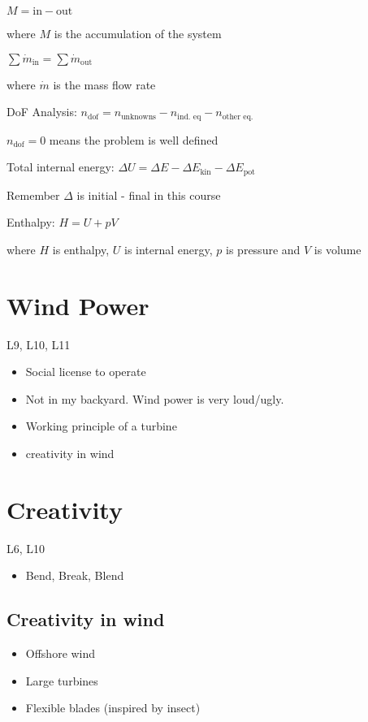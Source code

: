 \documentclass[a4paper, 12pt]{article}
\begin{document}
$M = \text{in} - \text{out}$

{\scriptsize where $M$ is the accumulation of the system\/}

$\sum \dot{m}_{\text{in}} = \sum \dot{m}_{\text{out}}$

{\scriptsize where $\dot{m}$ is the mass flow rate\/}

DoF Analysis:
$n_{\text{dof}} = n_{\text{unknowns}} - n_{\text{ind. eq}} - n_{\text{other eq.}}$

{\scriptsize $n_{\text{dof}}=0$ means the problem is well defined \/}

Total internal energy:
$\Delta U = \Delta E - \Delta E_{\text{kin}} - \Delta E_{\text{pot}}$

{\scriptsize Remember $\Delta$ is initial - final in this course\/}

Enthalpy:
$H = U + pV$

{\scriptsize where $H$ is enthalpy, $U$ is internal energy, $p$ is pressure and $V$ is volume\/}


\section*{Wind Power}
L9, L10, L11
\begin{itemize}
  \item Social license to operate
  \item Not in my backyard. Wind power is very loud/ugly.
  \item Working principle of a turbine
  \item creativity in wind
\end{itemize}

\section*{Creativity}
L6, L10
\begin{itemize}
  \item Bend, Break, Blend
\end{itemize}
\subsection*{Creativity in wind}
\begin{itemize}
  \item Offshore wind
  \item Large turbines
  \item Flexible blades (inspired by insect)
\end{itemize}
\end{document}
